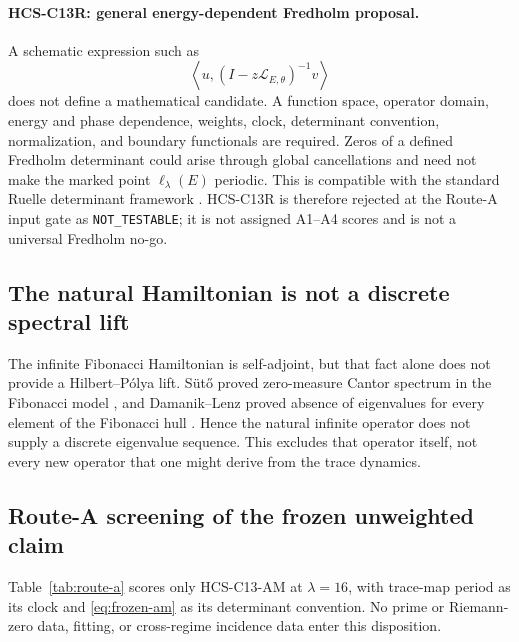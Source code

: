 \paragraph{HCS-C13R: general energy-dependent Fredholm proposal.}
A schematic expression such as
\begin{equation}
\left\langle u,(I-z\mathcal L_{E,\theta})^{-1}v\right\rangle
\label{eq:schematic-fredholm}
\end{equation}
does not define a mathematical candidate.  A function space, operator domain,
energy and phase dependence, weights, clock, determinant convention,
normalization, and boundary functionals are required.  Zeros of a defined
Fredholm determinant could arise through global cancellations and need not
make the marked point \(\ell_\lambda(E)\) periodic.  This is compatible with
the standard Ruelle determinant framework \citep{ruelle1976}.  HCS-C13R is
therefore rejected at the Route-A input gate as \texttt{NOT\_TESTABLE}; it is
not assigned A1--A4 scores and is not a universal Fredholm no-go.

\subsection{The natural Hamiltonian is not a discrete spectral lift}

The infinite Fibonacci Hamiltonian is self-adjoint, but that fact alone does
not provide a Hilbert--P{\'o}lya lift.  S{\"u}t{\H{o}} proved zero-measure
Cantor spectrum in the Fibonacci model \citep{suto1989}, and Damanik--Lenz
proved absence of eigenvalues for every element of the Fibonacci hull
\citep{damanik2000}.  Hence the natural infinite operator does not supply a
discrete eigenvalue sequence.  This excludes that operator itself, not every
new operator that one might derive from the trace dynamics.

\subsection{Route-A screening of the frozen unweighted claim}

Table~\ref{tab:route-a} scores only HCS-C13-AM at \(\lambda=16\), with
trace-map period as its clock and \eqref{eq:frozen-am} as its determinant
convention.  No prime or Riemann-zero data, fitting, or cross-regime incidence
data enter this disposition.

